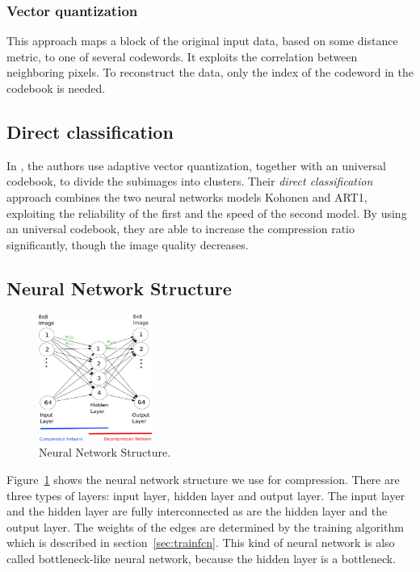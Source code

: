\subsubsection{Vector quantization}
This approach maps a block of the original input data, based on some distance metric, to one of several codewords. It exploits the correlation between neighboring pixels. To reconstruct the data, only the index of the codeword in the codebook is needed. 

\subsection{Direct classification}
In \cite{Soliman2006258}, the authors use adaptive vector quantization, together with an universal codebook, to divide the subimages into clusters. Their \emph{direct classification} approach combines the two neural networks models Kohonen and ART1, exploiting the reliability of the first and the speed of the second model. By using an universal codebook, they are able to increase the compression ratio significantly, though the image quality decreases.

\subsection{Neural Network Structure} \label{sec:neural_net_structure}
\begin{figure}[tbp]
  \centering
  \includegraphics[width=0.33\textwidth]{images/nnStructure}
  \caption{Neural Network Structure.}
  \label{fig:nnStructure}
\end{figure}

Figure~\ref{fig:nnStructure} shows the neural network structure we use for compression. There are three types of layers: input layer, hidden layer and output layer. The input layer and the hidden layer are fully interconnected as are the hidden layer and the output layer. The weights of the edges are determined by the training algorithm which is described in section~\ref{sec:trainfcn}. This kind of neural network is also called bottleneck-like neural network, because the hidden layer is a bottleneck.

